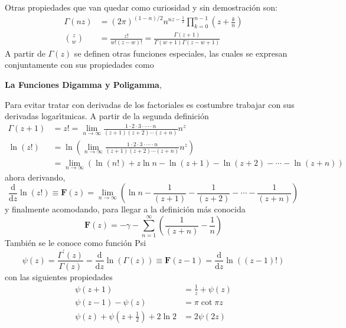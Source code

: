 \documentclass[spanish,notitlepage,letterpaper,12pt]{article}
\begin{document}
Otras propiedades que van quedar como curiosidad y sin demostraci\'{o}n son:
\begin{align*}
\Gamma\left(  nz\right)   & =\left(  2\pi\right)  ^{\left(  1-n\right)
/2}n^{nz-\frac12}\prod_{k=0}^{n-1}\left(  z+\frac kn\right) \\
\binom zw  & =\frac{z!}{w!(z-w)!}=\frac{\Gamma\left(  z+1\right)  }%
{\Gamma\left(  w+1\right)  \Gamma\left(  z-w+1\right)  }%
\end{align*}
A partir de $\Gamma\left(  z\right)  $ se definen otras funciones especiales,
las cuales se expresan conjuntamente con sus propiedades como

\begin{center}
\textbf{La Funciones Digamma y Poligamma},
\end{center}

Para evitar tratar con derivadas de los factoriales es costumbre trabajar con
sus derivadas logar\'{\i}tmicas. A partir de la segunda definici\'{o}n
\begin{align*}
\Gamma\left(  z+1\right)   & =z!=\lim_{n\rightarrow\infty}\frac{1\cdot
2\cdot3\cdot\cdots\cdot n}{\left(  z+1\right)  \left(  z+2\right)
\cdots\left(  z+n\right)  }n^{z}\\
\ln\left(  z!\right)   & =\ln\left(  \lim_{n\rightarrow\infty}\frac
{1\cdot2\cdot3\cdot\cdots\cdot n}{\left(  z+1\right)  \left(  z+2\right)
\cdots\left(  z+n\right)  }n^{z}\right) \\
& =\lim_{n\rightarrow\infty}\left(  \ln\left(  n!\right)  +z\ln n-\ln\left(
z+1\right)  -\ln\left(  z+2\right)  -\cdots-\ln\left(  z+n\right)  \right)
\end{align*}
ahora derivando,
\[
\frac{\mathrm{d}}{\mathrm{d}z}\ln\left(  z!\right)  \equiv\mathbf{F}%
(z)=\lim_{n\rightarrow\infty}\left(  \ln n-\frac1{\left(  z+1\right)  }%
-\frac1{\left(  z+2\right)  }-\cdots-\frac1{\left(  z+n\right)  }\right)
\]
y finalmente acomodando, para llegar a la definici\'{o}n m\'{a}s conocida
\[
\mathbf{F}(z)=-\gamma-\sum_{n=1}^{\infty}\left(  \frac1{\left(  z+n\right)
}-\frac1n\right)
\]
Tambi\'{e}n se le conoce como funci\'{o}n Psi
\[
\psi(z)=\frac{\Gamma^{\prime}\left(  z\right)  }{\Gamma\left(  z\right)
}=\frac{\mathrm{d}}{\mathrm{d}z}\ln\left(  \Gamma\left(  z\right)  \right)
\equiv\mathbf{F}(z-1)=\frac{\mathrm{d}}{\mathrm{d}z}\ln\left(  \left(
z-1\right)  !\right)
\]
con las siguientes propiedades
\begin{align*}
\psi(z+1)  & =\frac1z+\psi(z)\\
\psi(z-1)-\psi(z)  & =\pi\cot\pi z\\
\psi(z)+\psi\left(  z+\frac12\right)  +2\ln2  & =2\psi(2z)
\end{align*}
\end{document}
